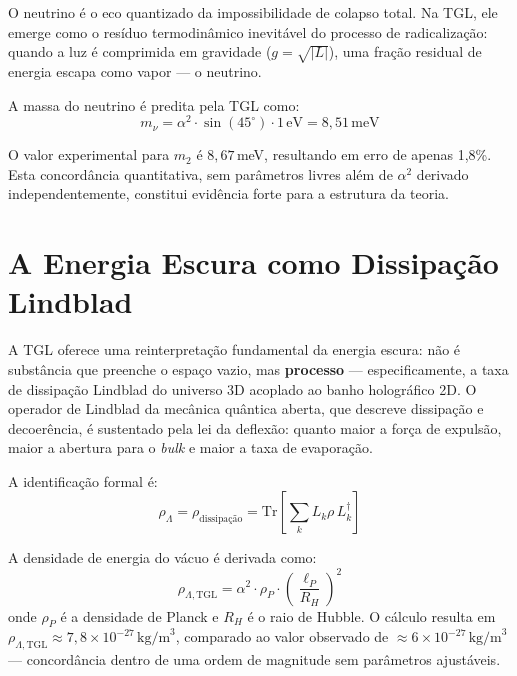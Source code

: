 \documentclass[12pt,a4paper,twoside]{article}
\newcommand{\alphaii}{\alpha^{2}}
\newcommand{\bulk}{\textit{bulk}}
\begin{document}
O neutrino \'e o eco quantizado da impossibilidade de colapso total. Na TGL, ele emerge como o res\'iduo termodin\^amico inevit\'avel do processo de radicaliza\c{c}\~ao: quando a luz \'e comprimida em gravidade ($g = \sqrt{|L|}$), uma fra\c{c}\~ao residual de energia escapa como vapor --- o neutrino.

A massa do neutrino \'e predita pela TGL como:
\begin{equation}
m_\nu = \alphaii \cdot \sin(45^\circ) \cdot 1\,\text{eV} = 8{,}51\,\text{meV}
\label{eq:massa_nu}
\end{equation}

O valor experimental para $m_2$ \'e $8{,}67$\,meV, resultando em erro de apenas 1,8\%. Esta concord\^ancia quantitativa, sem par\^ametros livres al\'em de $\alphaii$ derivado independentemente, constitui evid\^encia forte para a estrutura da teoria.


\section{A Energia Escura como Dissipa\c{c}\~ao Lindblad}


A TGL oferece uma reinterpreta\c{c}\~ao fundamental da energia escura: n\~ao \'e subst\^ancia que preenche o espa\c{c}o vazio, mas \textbf{processo} --- especificamente, a taxa de dissipa\c{c}\~ao Lindblad do universo 3D acoplado ao banho hologr\'afico 2D. O operador de Lindblad da mec\^anica qu\^antica aberta, que descreve dissipa\c{c}\~ao e decoer\^encia, \'e sustentado pela lei da deflex\~ao: quanto maior a for\c{c}a de expuls\~ao, maior a abertura para o \bulk{} e maior a taxa de evapora\c{c}\~ao.

A identifica\c{c}\~ao formal \'e:
\begin{equation}
\boxed{\rho_\Lambda = \rho_{\text{dissipa\c{c}\~ao}} = \text{Tr}\!\left[\sum_k L_k \rho\, L_k^\dagger\right]}
\label{eq:dark_energy}
\end{equation}

A densidade de energia do v\'acuo \'e derivada como:
\begin{equation}
\rho_{\Lambda,\text{TGL}} = \alphaii \cdot \rho_P \cdot \left(\frac{\ell_P}{R_H}\right)^{\!2}
\label{eq:rho_lambda}
\end{equation}
onde $\rho_P$ \'e a densidade de Planck e $R_H$ \'e o raio de Hubble. O c\'alculo resulta em $\rho_{\Lambda,\text{TGL}} \approx 7{,}8 \times 10^{-27}\,\text{kg/m}^3$, comparado ao valor observado de $\approx 6 \times 10^{-27}\,\text{kg/m}^3$ --- concord\^ancia dentro de uma ordem de magnitude sem par\^ametros ajust\'aveis.
\end{document}
